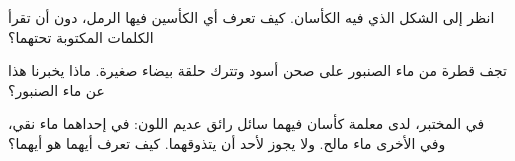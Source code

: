 \begin{exercise}[$\star\star$]\label{exo:g2:mixing-and-dissolving:9}
انظر إلى الشكل الذي فيه الكأسان. كيف تعرف أي الكأسين فيها الرمل، دون
أن تقرأ الكلمات المكتوبة تحتهما؟
\end{exercise}

\begin{exercise}[$\star\star$]\label{exo:g2:mixing-and-dissolving:10}
تجف قطرة من ماء الصنبور على صحن أسود وتترك حلقة بيضاء صغيرة. ماذا
يخبرنا هذا عن ماء الصنبور؟
\end{exercise}

\begin{exercise}[$\star\star$]\label{exo:g2:mixing-and-dissolving:11}
في المختبر، لدى معلمة كأسان فيهما سائل رائق عديم اللون: في إحداهما ماء
نقي، وفي الأخرى ماء مالح. ولا يجوز لأحد أن يتذوقهما. كيف تعرف أيهما
هو أيهما؟
\end{exercise}
